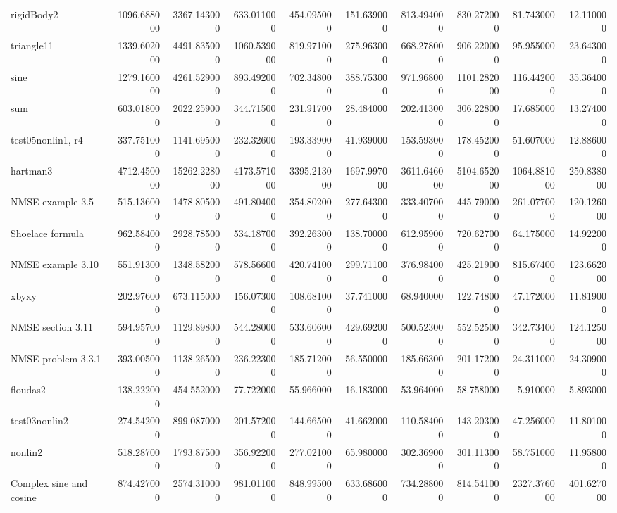 \begin{longtable}{lrrrrrrrrr}
rigidBody2 & 1096.688000 & 3367.143000 & 633.011000 & 454.095000 & 151.639000 & 813.494000 & 830.272000 & 81.743000 & 12.110000 \\
triangle11 & 1339.602000 & 4491.835000 & 1060.539000 & 819.971000 & 275.963000 & 668.278000 & 906.220000 & 95.955000 & 23.643000 \\
sine & 1279.160000 & 4261.529000 & 893.492000 & 702.348000 & 388.753000 & 971.968000 & 1101.282000 & 116.442000 & 35.364000 \\
sum & 603.018000 & 2022.259000 & 344.715000 & 231.917000 & 28.484000 & 202.413000 & 306.228000 & 17.685000 & 13.274000 \\
test05nonlin1, r4 & 337.751000 & 1141.695000 & 232.326000 & 193.339000 & 41.939000 & 153.593000 & 178.452000 & 51.607000 & 12.886000 \\
hartman3 & 4712.450000 & 15262.228000 & 4173.571000 & 3395.213000 & 1697.997000 & 3611.646000 & 5104.652000 & 1064.881000 & 250.838000 \\
NMSE example 3.5 & 515.136000 & 1478.805000 & 491.804000 & 354.802000 & 277.643000 & 333.407000 & 445.790000 & 261.077000 & 120.126000 \\
Shoelace formula & 962.584000 & 2928.785000 & 534.187000 & 392.263000 & 138.700000 & 612.959000 & 720.627000 & 64.175000 & 14.922000 \\
NMSE example 3.10 & 551.913000 & 1348.582000 & 578.566000 & 420.741000 & 299.711000 & 376.984000 & 425.219000 & 815.674000 & 123.662000 \\
xbyxy & 202.976000 & 673.115000 & 156.073000 & 108.681000 & 37.741000 & 68.940000 & 122.748000 & 47.172000 & 11.819000 \\
NMSE section 3.11 & 594.957000 & 1129.898000 & 544.280000 & 533.606000 & 429.692000 & 500.523000 & 552.525000 & 342.734000 & 124.125000 \\
NMSE problem 3.3.1 & 393.005000 & 1138.265000 & 236.223000 & 185.712000 & 56.550000 & 185.663000 & 201.172000 & 24.311000 & 24.309000 \\
floudas2 & 138.222000 & 454.552000 & 77.722000 & 55.966000 & 16.183000 & 53.964000 & 58.758000 & 5.910000 & 5.893000 \\
test03nonlin2 & 274.542000 & 899.087000 & 201.572000 & 144.665000 & 41.662000 & 110.584000 & 143.203000 & 47.256000 & 11.801000 \\
nonlin2 & 518.287000 & 1793.875000 & 356.922000 & 277.021000 & 65.980000 & 302.369000 & 301.113000 & 58.751000 & 11.958000 \\
Complex sine and cosine & 874.427000 & 2574.310000 & 981.011000 & 848.995000 & 633.686000 & 734.288000 & 814.541000 & 2327.376000 & 401.627000 \\

\end{longtable}

